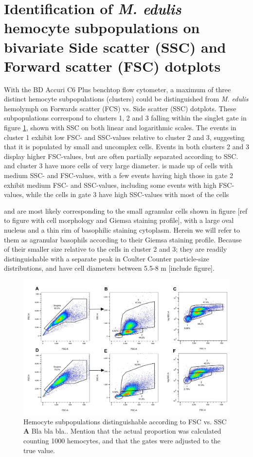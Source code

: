 \section{Identification of \emph{M. edulis} hemocyte subpopulations on bivariate Side scatter (SSC) and Forward scatter (FSC) dotplots}
With the BD Accuri C6 Plus benchtop flow cytometer, a maximum of three distinct hemocyte subpopulations (clusters) could be distinguished from \emph{M. edulis} hemolymph on Forwards scatter (FCS) vs. Side scatter (SSC) dotplots. These subpopulations correspond to clusters 1, 2 and 3 
 falling within the singlet gate in figure \ref{fig:fsc_vs_ssc}, shown with SSC on both linear and logarithmic scales. The events in cluster 1 exhibit low FSC- and SSC-values relative to cluster 2 and 3, suggesting that it is populated by small and uncomplex cells. Events in both clusters 2 and 3 display higher FSC-values, but are often partially separated according to SSC.  and cluster 3 have more cells of very large diameter. is made up of cells with medium SSC- and FSC-values, with a few events having high those in gate 2 exhibit medium FSC- and SSC-values, including some events with high FSC-values, while the cells in gate 3 have high SSC-values with most of the cells

and are most likely corresponding to the small agranular cells shown in figure [ref to figure with cell morphology and Giemsa staining profile], with a large oval nucleus and a thin rim of basophilic staining cytoplasm. Herein we will refer to them as agranular basophils according to their Giemsa staining profile. Because of their smaller size relative to the cells in cluster 2 and 3; they are readily distinguishable with a separate peak in Coulter Counter particle-size distributions, and have cell diameters between 5.5-8 \micro m [include figure].



\begin{figure}[!ht]
    \centering
    \includegraphics[width=1.0\textwidth]{figures/Gating strategy/lin to log.pdf}
    \caption{Hemocyte subpopulations distinguishable according to FSC vs. SSC \textbf{A} Bla bla bla.. Mention that the actual proportion was calculated counting 1000 hemocytes, and that the gates were adjusted to the true value.}
    \label{fig:fsc_vs_ssc}
\end{figure}

